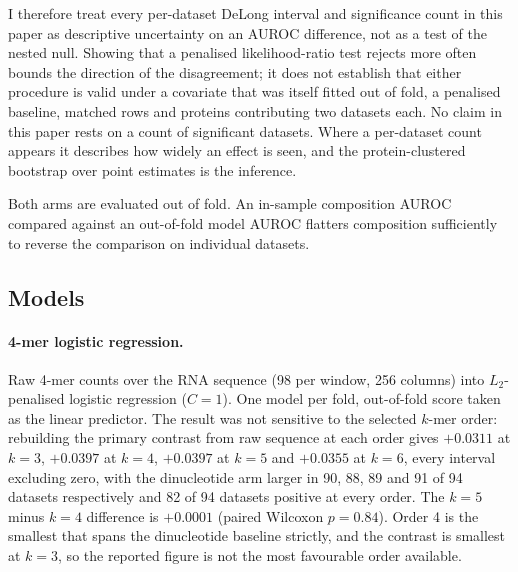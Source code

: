 I therefore treat every per-dataset DeLong interval and significance count in this paper as
descriptive uncertainty on an AUROC difference, not as a test of the nested null. Showing
that a penalised likelihood-ratio test rejects more often bounds the direction of the
disagreement; it does not establish that either procedure is valid under a covariate that was
itself fitted out of fold, a penalised baseline, matched rows and proteins contributing two
datasets each. No claim in this paper rests on a count of significant datasets. Where a
per-dataset count appears it describes how widely an effect is seen, and the protein-clustered
bootstrap over point estimates is the inference.

Both arms are evaluated out of fold. An in-sample composition AUROC compared against an
out-of-fold model AUROC flatters composition sufficiently to reverse the comparison on
individual datasets.

\subsection{Models}
\label{sec:methods-models}

\paragraph{4-mer logistic regression.} Raw 4-mer counts over the RNA sequence (98 per window,
256 columns) into $L_2$-penalised logistic regression ($C=1$). One model per fold, out-of-fold
score taken as the linear predictor. The result was not sensitive to the selected $k$-mer
order: rebuilding the primary contrast from raw sequence at each order gives $+0.0311$
at $k=3$, $+0.0397$ at $k=4$, $+0.0397$ at $k=5$ and $+0.0355$ at $k=6$, every interval
excluding zero, with the dinucleotide arm larger in 90, 88, 89 and 91 of 94 datasets
respectively and 82 of 94 datasets positive at every order. The $k=5$ minus $k=4$ difference is
$+0.0001$ (paired Wilcoxon $p=0.84$). Order 4 is the smallest that spans the dinucleotide
baseline strictly, and the contrast is smallest at $k=3$, so the reported figure is not the
most favourable order available.

